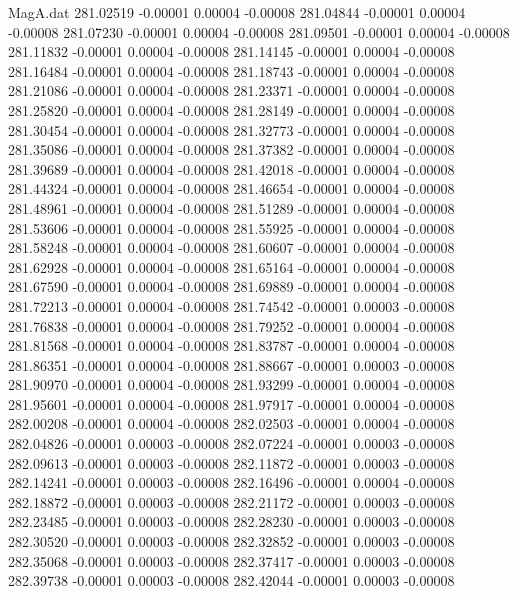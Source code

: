 \begin{filecontents}{MagA.dat}
 281.02519   -0.00001    0.00004   -0.00008
 281.04844   -0.00001    0.00004   -0.00008
 281.07230   -0.00001    0.00004   -0.00008
 281.09501   -0.00001    0.00004   -0.00008
 281.11832   -0.00001    0.00004   -0.00008
 281.14145   -0.00001    0.00004   -0.00008
 281.16484   -0.00001    0.00004   -0.00008
 281.18743   -0.00001    0.00004   -0.00008
 281.21086   -0.00001    0.00004   -0.00008
 281.23371   -0.00001    0.00004   -0.00008
 281.25820   -0.00001    0.00004   -0.00008
 281.28149   -0.00001    0.00004   -0.00008
 281.30454   -0.00001    0.00004   -0.00008
 281.32773   -0.00001    0.00004   -0.00008
 281.35086   -0.00001    0.00004   -0.00008
 281.37382   -0.00001    0.00004   -0.00008
 281.39689   -0.00001    0.00004   -0.00008
 281.42018   -0.00001    0.00004   -0.00008
 281.44324   -0.00001    0.00004   -0.00008
 281.46654   -0.00001    0.00004   -0.00008
 281.48961   -0.00001    0.00004   -0.00008
 281.51289   -0.00001    0.00004   -0.00008
 281.53606   -0.00001    0.00004   -0.00008
 281.55925   -0.00001    0.00004   -0.00008
 281.58248   -0.00001    0.00004   -0.00008
 281.60607   -0.00001    0.00004   -0.00008
 281.62928   -0.00001    0.00004   -0.00008
 281.65164   -0.00001    0.00004   -0.00008
 281.67590   -0.00001    0.00004   -0.00008
 281.69889   -0.00001    0.00004   -0.00008
 281.72213   -0.00001    0.00004   -0.00008
 281.74542   -0.00001    0.00003   -0.00008
 281.76838   -0.00001    0.00004   -0.00008
 281.79252   -0.00001    0.00004   -0.00008
 281.81568   -0.00001    0.00004   -0.00008
 281.83787   -0.00001    0.00004   -0.00008
 281.86351   -0.00001    0.00004   -0.00008
 281.88667   -0.00001    0.00003   -0.00008
 281.90970   -0.00001    0.00004   -0.00008
 281.93299   -0.00001    0.00004   -0.00008
 281.95601   -0.00001    0.00004   -0.00008
 281.97917   -0.00001    0.00004   -0.00008
 282.00208   -0.00001    0.00004   -0.00008
 282.02503   -0.00001    0.00004   -0.00008
 282.04826   -0.00001    0.00003   -0.00008
 282.07224   -0.00001    0.00003   -0.00008
 282.09613   -0.00001    0.00003   -0.00008
 282.11872   -0.00001    0.00003   -0.00008
 282.14241   -0.00001    0.00003   -0.00008
 282.16496   -0.00001    0.00004   -0.00008
 282.18872   -0.00001    0.00003   -0.00008
 282.21172   -0.00001    0.00003   -0.00008
 282.23485   -0.00001    0.00003   -0.00008
 282.28230   -0.00001    0.00003   -0.00008
 282.30520   -0.00001    0.00003   -0.00008
 282.32852   -0.00001    0.00003   -0.00008
 282.35068   -0.00001    0.00003   -0.00008
 282.37417   -0.00001    0.00003   -0.00008
 282.39738   -0.00001    0.00003   -0.00008
 282.42044   -0.00001    0.00003   -0.00008

\end{filecontents}
